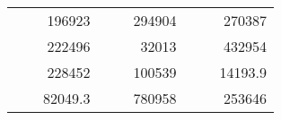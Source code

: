 \begin{table}[H]
\begin{tabular}{|ccrccrccc}
\rowcolor[HTML]{DAE8FC} 
\multicolumn{1}{|c|}{\cellcolor[HTML]{FFFFC7}}                                & \multicolumn{1}{c|}{\cellcolor[HTML]{DAE8FC}}                      & \multicolumn{1}{r|}{\cellcolor[HTML]{DAE8FC}196923}    & \multicolumn{1}{c|}{\cellcolor[HTML]{FFFFC7}}                                & \multicolumn{1}{c|}{\cellcolor[HTML]{DAE8FC}}                       & \multicolumn{1}{r|}{\cellcolor[HTML]{DAE8FC}294904}    & \multicolumn{1}{c|}{\cellcolor[HTML]{FFFFC7}}                                & \multicolumn{1}{c|}{\cellcolor[HTML]{DAE8FC}}                      & \multicolumn{1}{r|}{\cellcolor[HTML]{DAE8FC}270387}    \\ \cline{3-3} \cline{6-6} \cline{9-9} 
\multicolumn{1}{|c|}{\cellcolor[HTML]{FFFFC7}}                                & \multicolumn{1}{c|}{\cellcolor[HTML]{DAE8FC}}                      & \multicolumn{1}{r|}{\cellcolor[HTML]{DDFDFF}222496}    & \multicolumn{1}{c|}{\cellcolor[HTML]{FFFFC7}}                                & \multicolumn{1}{c|}{\cellcolor[HTML]{DAE8FC}}                       & \multicolumn{1}{r|}{\cellcolor[HTML]{DDFDFF}32013}     & \multicolumn{1}{c|}{\cellcolor[HTML]{FFFFC7}}                                & \multicolumn{1}{c|}{\cellcolor[HTML]{DAE8FC}}                      & \multicolumn{1}{r|}{\cellcolor[HTML]{DDFDFF}432954}    \\ \cline{3-3} \cline{6-6} \cline{9-9} 
\rowcolor[HTML]{DAE8FC} 
\multicolumn{1}{|c|}{\cellcolor[HTML]{FFFFC7}}                                & \multicolumn{1}{c|}{\cellcolor[HTML]{DAE8FC}}                      & \multicolumn{1}{r|}{\cellcolor[HTML]{DAE8FC}228452}    & \multicolumn{1}{c|}{\cellcolor[HTML]{FFFFC7}}                                & \multicolumn{1}{c|}{\cellcolor[HTML]{DAE8FC}}                       & \multicolumn{1}{r|}{\cellcolor[HTML]{DAE8FC}100539}    & \multicolumn{1}{c|}{\cellcolor[HTML]{FFFFC7}}                                & \multicolumn{1}{c|}{\cellcolor[HTML]{DAE8FC}}                      & \multicolumn{1}{r|}{\cellcolor[HTML]{DAE8FC}14193.9}   \\ \cline{3-3} \cline{6-6} \cline{9-9} 
\multicolumn{1}{|c|}{\cellcolor[HTML]{FFFFC7}}                                & \multicolumn{1}{c|}{\cellcolor[HTML]{DAE8FC}}                      & \multicolumn{1}{r|}{\cellcolor[HTML]{DDFDFF}82049.3}   & \multicolumn{1}{c|}{\cellcolor[HTML]{FFFFC7}}                                & \multicolumn{1}{c|}{\cellcolor[HTML]{DAE8FC}}                       & \multicolumn{1}{r|}{\cellcolor[HTML]{DDFDFF}780958}    & \multicolumn{1}{c|}{\cellcolor[HTML]{FFFFC7}}                                & \multicolumn{1}{c|}{\cellcolor[HTML]{DAE8FC}}                      & \multicolumn{1}{r|}{\cellcolor[HTML]{DDFDFF}253646}    \\ \cline{3-3} \cline{6-6} \cline{9-9} 

\end{tabular}
\end{table}
